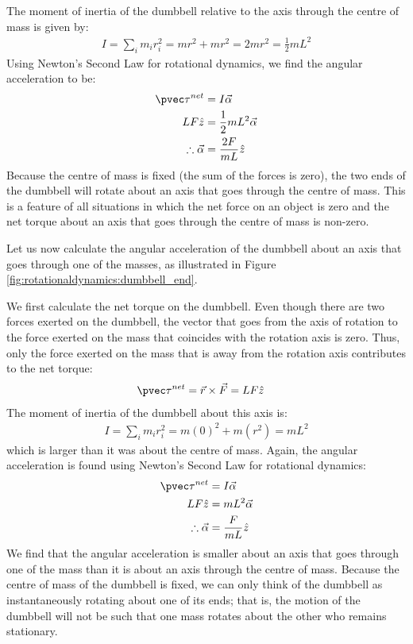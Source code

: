\begin{example}
The moment of inertia of the dumbbell relative to the axis through the centre of mass is given by:
\begin{align*}
I = \sum_i  m_ir_i^2 = mr^2 +mr^2 = 2mr^2 = \frac{1}{2}mL^2
\end{align*}
Using Newton's Second Law for rotational dynamics, we find the angular acceleration to be:
\begin{align*}
\pvec \tau^{net}&= I\vec\alpha\\
LF\hat z&=\frac{1}{2}mL^2\vec\alpha\\
\therefore \vec\alpha &= \frac{2F}{mL}\hat z
\end{align*}
Because the centre of mass is fixed (the sum of the forces is zero), the two ends of the dumbbell will rotate about an axis that goes through the centre of mass. This is a feature of all situations in which the net force on an object is zero and the net torque about an axis that goes through the centre of mass is non-zero.

Let us now calculate the angular acceleration of the dumbbell about an axis that goes through one of the masses, as illustrated in Figure \ref{fig:rotationaldynamics:dumbbell_end}.

We first calculate the net torque on the dumbbell. Even though there are two forces exerted on the dumbbell, the vector that goes from the axis of rotation to the force exerted on the mass that coincides with the rotation axis is zero. Thus, only the force exerted on the mass that is away from the rotation axis contributes to the net torque:
\begin{align*}
\pvec\tau^{net}&= \vec r \times \vec F = LF\hat z
\end{align*}
The moment of inertia of the dumbbell about this axis is:
\begin{align*}
I = \sum_i  m_ir_i^2 = m(0)^2 + m(r^2) = mL^2
\end{align*}
which is larger than it was about the centre of mass. Again, the angular acceleration is found using Newton's Second Law for rotational dynamics:
\begin{align*}
\pvec \tau^{net}&= I\vec\alpha\\
LF\hat z&=mL^2\vec\alpha\\
\therefore \vec\alpha &= \frac{F}{mL}\hat z
\end{align*}
We find that the angular acceleration is smaller about an axis that goes through one of the mass than it is about an axis through the centre of mass. Because the centre of mass of the dumbbell is fixed, we can only think of the dumbbell as instantaneously rotating about one of its ends; that is, the motion of the dumbbell will not be such that one mass rotates about the other who remains stationary.


\end{example}
